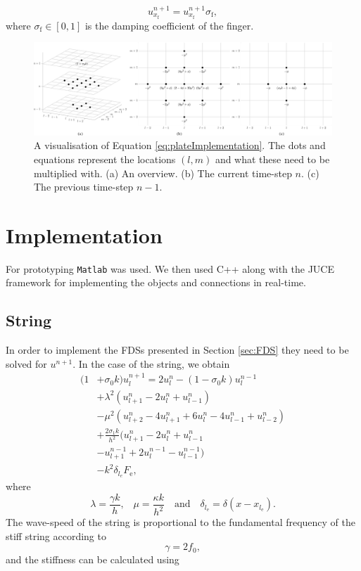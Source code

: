 \documentclass{article}
\begin{document}
\begin{equation}
    u_{x_\text{f}}^{n+1} = u_{x_\text{f}}^{n+1}  \sigma_\text{f},
\end{equation}
where $\sigma_\text{f} \in [0,1]$ is the damping coefficient of the finger. 
\begin{figure}[t]
    \centering
    \includegraphics[width=2.1\columnwidth]{FullPlate}
    \caption{A visualisation of Equation \eqref{eq:plateImplementation}. The dots and equations represent the locations $(l,m)$ and what these need to be multiplied with. (a) An overview. (b) The current time-step $n$. (c) The previous time-step $n-1$. \label{fig:example}}
 \end{figure}
\section{Implementation}
For prototyping \texttt{Matlab} was used. We then used C++ along with the JUCE framework for implementing the objects and connections in real-time.
\subsection{String}
In order to implement the FDSs presented in Section \ref{sec:FDS} they need to be solved for $u^{n+1}$. In the case of the string, we obtain
\begin{equation}
    \begin{aligned}\label{eq:stringImplementatino}
        (1 &+ \sigma_0k)u_l^{n+1} = 2u_l^n - (1 - \sigma_0k) u_l^{n-1} \\
        & +\lambda^2(u_{l+1}^n - 2u_l^n + u_{l-1}^n)\\
        &- \mu^2(u_{l+2}^n - 4u_{l+1}^n + 6u_l^n - 4u_{l-1}^n + u_{l-2}^n) \\
        &+ \frac{2\sigma_1k}{h^2}(u_{l+1}^n - 2u_l^n + u_{l-1}^n\\
        &- u_{l+1}^{n-1} + 2u_l^{n-1} - u_{l-1}^{n-1})\\
        &-k^2\delta_{l_e}F_\text{e},
    \end{aligned}
\end{equation}
where
\begin{equation}\nonumber
\lambda = \frac{\gamma k}{h}\text{,} \quad \mu =  \frac{\kappa k}{h^2} \quad \text{and} \quad \delta_{l_\text{e}} = \delta(x-x_{l_\text{e}}). 
\end{equation}
The wave-speed of the string is proportional to the fundamental frequency of the stiff string according to
\begin{equation}
    \gamma = 2 f_0,
\end{equation}
and the stiffness can be calculated using
\end{document}
